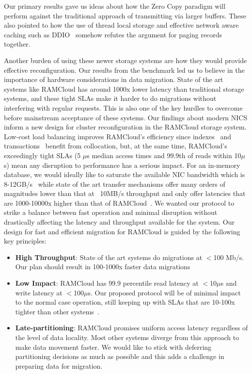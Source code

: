 Our primary results gave us ideas about how the Zero Copy paradigm will perform against
the traditional approach of transmitting via larger buffers. These also pointed 
to how the use of thread local storage and effective network aware caching such as DDIO~\cite{ddio}
somehow refutes the argument for paging records together.

Another burden of using these newer storage systems are how they would provide effective 
reconfiguration. Our results from the benchmark led us to believe in the importance of 
hardware considerations in data migration. State of the art systems like RAMCloud has around 1000x
lower latency than traditional storage systems, and these tight SLAs make it harder to do migrations
without interfering with regular requests. This is also one of the key hurdles 
to overcome before mainstream acceptance of these systems.
Our findings about modern NICS inform a new design for cluster reconfiguration
in the RAMCloud storage system. Low-cost load balancing improves RAMCloud’s
efficiency since indexes~\cite{slik} and transactions~\cite{ramcloudtx} benefit from collocation, but, at the same time, RAMCloud’s exceedingly tight SLAs (5 $\mu$s median
access times and 99.9th of reads within 10$\mu$s) mean any disruption to performance
has a serious impact. For an in-memory database, we would ideally like to saturate the
available NIC bandwidth which is 8-12GB/s~\cite{cx3,cx4} while state of the art 
transfer mechanisms offer many orders of magnitudes lower than that at ~10MB/s 
throughput and only offer latencies that are 1000-10000x higher than that of RAMCloud~\cite{ramcloud}.
We wanted our protocol to strike a balance between fast operation and minimal disruption without drastically affecting
the latency and throughput available for the system. Our design for fast and efficient migration
for RAMCloud is guided by the following key principles:
\begin{itemize}
\item{\textbf{High Throughput}}: State of the art systems do migrations at $<$100 Mb/s. Our plan
should result in 100-1000x faster data migrations
\item{\textbf{Low Impact}}: RAMCloud has 99.9 percentile read latency at $<$10$\mu$s and write latency
at $<$100$\mu$s. Our proposed protocol will be of minimal impact to the normal case operation, still keeping
up with SLAs that are 10-100x tighter than other systems~\cite{squall}.
\item{\textbf{Late-partitioning}}: RAMCloud promises uniform access latency regardless of the level of data locality.
Most other systems diverge from this approach to make data movement faster. We would like to stick with
deferring partitioning decisions as much as possible and this adds a challenge in preparing data for migration.
\end{itemize}


